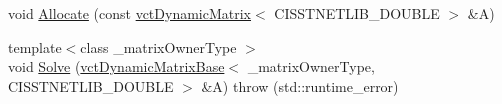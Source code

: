 {\bf }\par
\begin{DoxyCompactItemize}
\item 
void \hyperlink{classnmr_p_inverse_solver_ab7941745d59905a3edc00934a39bb3d4}{Allocate} (const \hyperlink{classvct_dynamic_matrix}{vct\+Dynamic\+Matrix}$<$ C\+I\+S\+S\+T\+N\+E\+T\+L\+I\+B\+\_\+\+D\+O\+U\+B\+L\+E $>$ \&A)
\end{DoxyCompactItemize}

{\bf }\par
\begin{DoxyCompactItemize}
\item 
{\footnotesize template$<$class \+\_\+matrix\+Owner\+Type $>$ }\\void \hyperlink{classnmr_p_inverse_solver_aac1f684ee9607cd5538f354a2f77dfa3}{Solve} (\hyperlink{classvct_dynamic_matrix_base}{vct\+Dynamic\+Matrix\+Base}$<$ \+\_\+matrix\+Owner\+Type, C\+I\+S\+S\+T\+N\+E\+T\+L\+I\+B\+\_\+\+D\+O\+U\+B\+L\+E $>$ \&A)  throw (std\+::runtime\+\_\+error)
\end{DoxyCompactItemize}

